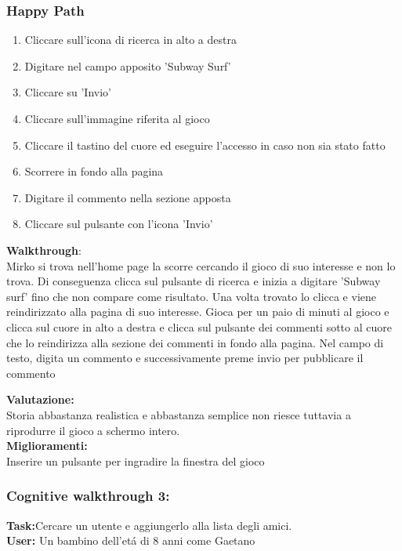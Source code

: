 \documentclass[../Report.tex]{subfiles}
\begin{document}
    \subsubsection{Happy Path}
\begin{enumerate}
    \item Cliccare sull'icona di ricerca in alto a destra
    \item Digitare nel campo apposito 'Subway Surf'
    \item Cliccare su 'Invio'
    \item Cliccare sull'immagine riferita al gioco
    \item Cliccare il tastino del cuore ed eseguire l'accesso in caso non sia stato fatto
    \item Scorrere in fondo alla pagina
    \item Digitare il commento nella sezione apposta
    \item Cliccare sul pulsante con l'icona 'Invio'
\end{enumerate}
\textbf{Walkthrough}:\\
    Mirko si trova nell'home page la scorre cercando il gioco di suo interesse e non lo trova.
    Di conseguenza clicca sul pulsante di ricerca e inizia a digitare 'Subway surf' fino che non compare come risultato.
    Una volta trovato lo clicca e viene reindirizzato alla pagina di suo interesse.
    Gioca per un paio di minuti al gioco e clicca sul cuore in alto a destra e clicca sul pulsante dei commenti sotto al cuore che lo reindirizza alla sezione dei commenti in fondo alla pagina.
    Nel campo di testo, digita un commento e successivamente preme invio per pubblicare il commento

    \textbf{Valutazione:}\\Storia abbastanza realistica e abbastanza semplice non riesce tuttavia a riprodurre il gioco a schermo intero.\\

    \textbf{Miglioramenti:}\\Inserire un pulsante per ingradire la finestra del gioco

    \subsubsection{Cognitive walkthrough 3:}
    \textbf{Task:}Cercare un utente e aggiungerlo alla lista degli amici.\\
    \textbf{User:} Un bambino dell'etá di 8 anni come Gaetano
\end{document}

